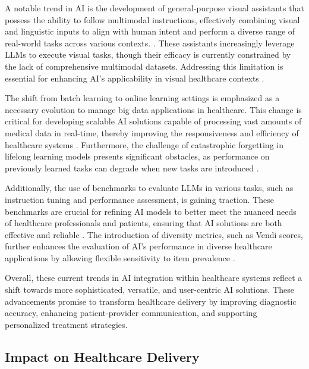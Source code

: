 A notable trend in AI is the development of general-purpose visual assistants that possess the ability to follow multimodal instructions, effectively combining visual and linguistic inputs to align with human intent and perform a diverse range of real-world tasks across various contexts. \cite{liu2024visual}. These assistants increasingly leverage LLMs to execute visual tasks, though their efficacy is currently constrained by the lack of comprehensive multimodal datasets. Addressing this limitation is essential for enhancing AI's applicability in visual healthcare contexts .



The shift from batch learning to online learning settings is emphasized as a necessary evolution to manage big data applications in healthcare. This change is critical for developing scalable AI solutions capable of processing vast amounts of medical data in real-time, thereby improving the responsiveness and efficiency of healthcare systems \cite{wu2015largescaleonlinefeatureselection}. Furthermore, the challenge of catastrophic forgetting in lifelong learning models presents significant obstacles, as performance on previously learned tasks can degrade when new tasks are introduced \cite{zhao2022lifelonglearningmultilingualneural}.



Additionally, the use of benchmarks to evaluate LLMs in various tasks, such as instruction tuning and performance assessment, is gaining traction. These benchmarks are crucial for refining AI models to better meet the nuanced needs of healthcare professionals and patients, ensuring that AI solutions are both effective and reliable . The introduction of diversity metrics, such as Vendi scores, further enhances the evaluation of AI's performance in diverse healthcare applications by allowing flexible sensitivity to item prevalence \cite{pasarkar2024cousinsvendiscorefamily}.



Overall, these current trends in AI integration within healthcare systems reflect a shift towards more sophisticated, versatile, and user-centric AI solutions. These advancements promise to transform healthcare delivery by improving diagnostic accuracy, enhancing patient-provider communication, and supporting personalized treatment strategies.



\subsection{Impact on Healthcare Delivery} \label{subsec:Impact on Healthcare Delivery}



